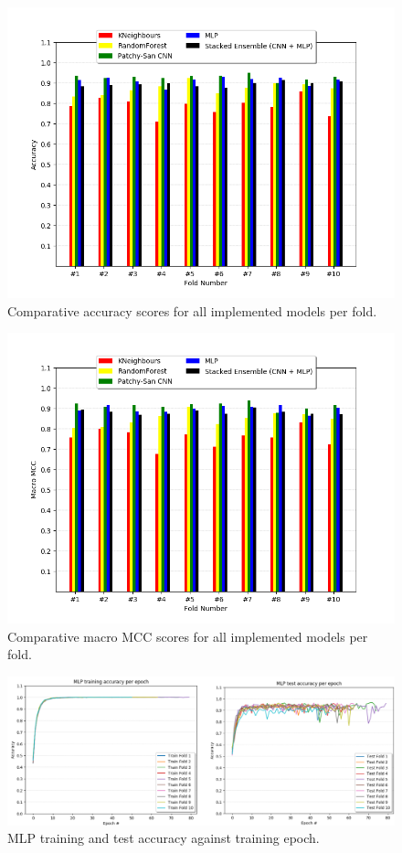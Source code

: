    \begin{figure}[H]
  \centering
  \centerline{\includegraphics[scale=0.8]{Images/acc_per_fold.png}}
  \caption{Comparative accuracy scores for all implemented models per fold.}
  \label{acc_per_fold}
\end{figure}

\begin{figure}[H]
  \centering
  \centerline{\includegraphics[scale=0.8]{Images/macro_mcc_per_fold.png}}
  \caption{Comparative macro MCC scores for all implemented models per fold.}
  \label{macro_mcc_per_fold}
\end{figure}

\begin{figure}[H]
  \centering
  \centerline{\includegraphics[scale=0.55]{Images/mlp_train_test.png}}
  \caption{MLP training and test accuracy against training epoch.}
  \label{cnn_train_test}
\end{figure}

